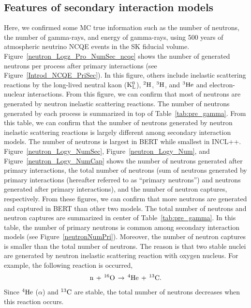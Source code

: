 \subsection{Features of secondary interaction models}\label{Subsec_Features}
\vs\hs
Here, we confirmed some MC true information such as the number of neutrons, the number of gamma-rays, and energy of gamma-rays, using 500 years of atmospheric neutrino NCQE events in the SK fiducial volume.
Figure~\ref{neutron_Logz_Pro_NumSec_ncqe} shows the number of generated neutrons per process after primary interactions (see Figure~\ref{Introd_NCQE_PriSec}).
In this figure, others include inelastic scattering reactions by the long-lived neutral kaon (${\rm K}^{0}_{\rm L}$), $^{2}{\rm H}$, $^{3}{\rm H}$, and $^{3}{\rm He}$ and electron-nuclear interactions.
From this figure, we can confirm that most of neutrons are generated by neutron inelastic scattering reactions.
The number of neutrons generated by each process is summarized in top of Table~\ref{tab:pre_gamma}.
From this table, we can confirm that the number of neutrons generated by neutron inelastic scattering reactions is largely different among secondary interaction models.
The number of neutrons is largest in BERT while smallest in INCL++.\\
\hs
Figure~\ref{neutron_Logy_NumSec}, Figure~\ref{neutron_Logy_Num}, and Figure~\ref{neutron_Logy_NumCap} shows the number of neutrons generated after primary interactions, the total number of neutrons (sum of neutrons generated by primary interactions (hereafter referred to as ``primary neutrons'') and neutrons generated after primary interactions), and the number of neutron captures, respectively.
From these figures, we can confirm that more neutrons are generated and captured in BERT than other two models.
The total number of neutrons and neutron captures are summarized in center of Table~\ref{tab:pre_gamma}.
In this table, the number of primary neutrons is common among secondary interaction models (see Figure~\ref{neutronNumPri}).
Moreover, the number of neutron captures is smaller than the total number of neutrons.
The reason is that two stable nuclei are generated by neutron inelastic scattering reaction with oxygen nucleus.
For example, the following reaction is occurred,
\begin{eqnarray}
	{\rm n}\,+\,^{16}{\rm O}\,\to\,^{4}{\rm He}\,+\,^{13}{\rm C}.
\end{eqnarray}
Since $^{4}{\rm He}$ ($\alpha$) and $^{13}{\rm C}$ are stable, the total number of neutrons decreases when this reaction occurs.


